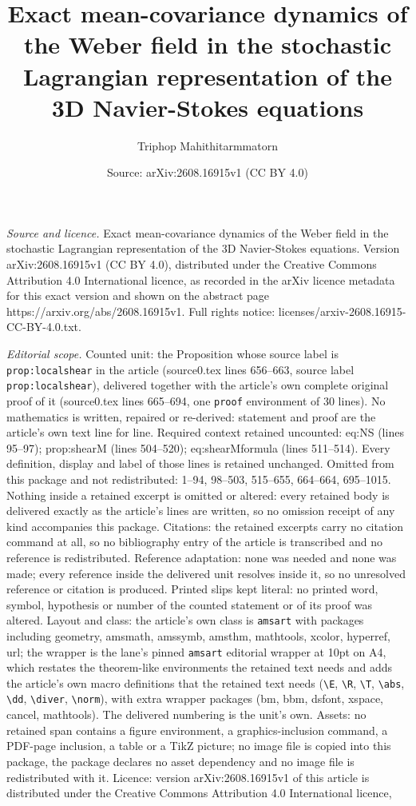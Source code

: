\documentclass[10pt,a4paper]{amsart}
\title[Exact mean-covariance dynamics of the Weber field in the sto]{Exact mean-covariance dynamics of the Weber field in the stochastic Lagrangian representation of the 3D Navier-Stokes equations}
\author{Triphop Mahithitarmmatorn}
\date{Source: arXiv:2608.16915v1 (CC BY 4.0)}
\begin{document}
\maketitle

\noindent\emph{Source and licence.} Exact mean-covariance dynamics of the Weber field in the stochastic Lagrangian representation of the 3D Navier-Stokes equations. Version arXiv:2608.16915v1 (CC BY 4.0), distributed under the Creative Commons Attribution 4.0 International licence, as recorded in the arXiv licence metadata for this exact version and shown on the abstract page https://arxiv.org/abs/2608.16915v1. Full rights notice: licenses/arxiv-2608.16915-CC-BY-4.0.txt.\par\smallskip

\noindent\textit{Editorial scope.} Counted unit: the Proposition whose source label is \texttt{prop:localshear} in the article (source0.tex lines 656--663, source label \texttt{prop:localshear}), delivered together with the article's own complete original proof of it (source0.tex lines 665--694, one \texttt{proof} environment of 30 lines). No mathematics is written, repaired or re-derived: statement and proof are the article's own text line for line. Required context retained uncounted: eq:NS (lines 95--97); prop:shearM (lines 504--520); eq:shearMformula (lines 511--514). Every definition, display and label of those lines is retained unchanged. Omitted from this package and not redistributed: 1--94, 98--503, 515--655, 664--664, 695--1015. Nothing inside a retained excerpt is omitted or altered: every retained body is delivered exactly as the article's lines are written, so no omission receipt of any kind accompanies this package. Citations: the retained excerpts carry no citation command at all, so no bibliography entry of the article is transcribed and no reference is redistributed. Reference adaptation: none was needed and none was made; every reference inside the delivered unit resolves inside it, so no unresolved reference or citation is produced. Printed slips kept literal: no printed word, symbol, hypothesis or number of the counted statement or of its proof was altered. Layout and class: the article's own class is \texttt{amsart} with packages including geometry, amsmath, amssymb, amsthm, mathtools, xcolor, hyperref, url; the wrapper is the lane's pinned \texttt{amsart} editorial wrapper at 10pt on A4, which restates the theorem-like environments the retained text needs and adds the article's own macro definitions that the retained text needs (\texttt{\textbackslash E}, \texttt{\textbackslash R}, \texttt{\textbackslash T}, \texttt{\textbackslash abs}, \texttt{\textbackslash dd}, \texttt{\textbackslash diver}, \texttt{\textbackslash norm}), with extra wrapper packages (bm, bbm, dsfont, xspace, cancel, mathtools). The delivered numbering is the unit's own. Assets: no retained span contains a figure environment, a graphics-inclusion command, a PDF-page inclusion, a table or a TikZ picture; no image file is copied into this package, the package declares no asset dependency and no image file is redistributed with it. Licence: version arXiv:2608.16915v1 of this article is distributed under the Creative Commons Attribution 4.0 International licence, 
\end{document}
